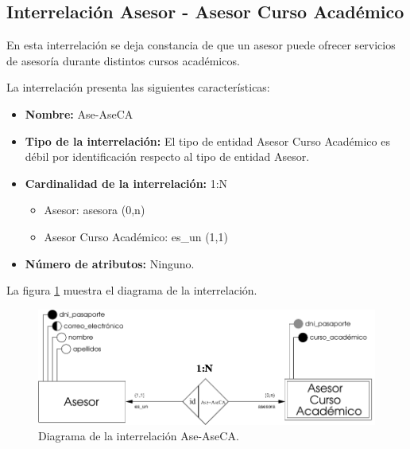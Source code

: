 \subsection{Interrelación Asesor - Asesor Curso Académico}

   \begin{description}
      \item[Definición] En esta interrelación se deja constancia de que un
      asesor puede ofrecer servicios de asesoría durante distintos cursos
      académicos.

      \item[Características] La interrelación presenta las siguientes
                             características:

         \begin{itemize}
            \item \textbf{Nombre:} Ase-AseCA
            \item \textbf{Tipo de la interrelación:} El tipo de entidad
                  Asesor Curso Académico es débil por identificación respecto al
                  tipo de entidad Asesor.
            \item \textbf{Cardinalidad de la interrelación:} 1:N
                  \begin{itemize}
                     \item Asesor: asesora (0,n)
                     \item Asesor Curso Académico: es\_un (1,1)
                  \end{itemize}
            \item \textbf{Número de atributos:} Ninguno.
         \end{itemize}

      \item[Diagrama] La figura \ref{diagramaAse-AseCA} muestra el diagrama de la
                      interrelación.

      \item \begin{figure}[!ht]
            \begin{center}
            \includegraphics[]{07.Modelo_Entidad-Interrelacion/7.3.Analisis_Interrelaciones/diagramas/Ase-AseCA.pdf}
            \caption{Diagrama de la interrelación Ase-AseCA.}
            \label{diagramaAse-AseCA}
            \end{center}
         \end{figure}


\end{description}
